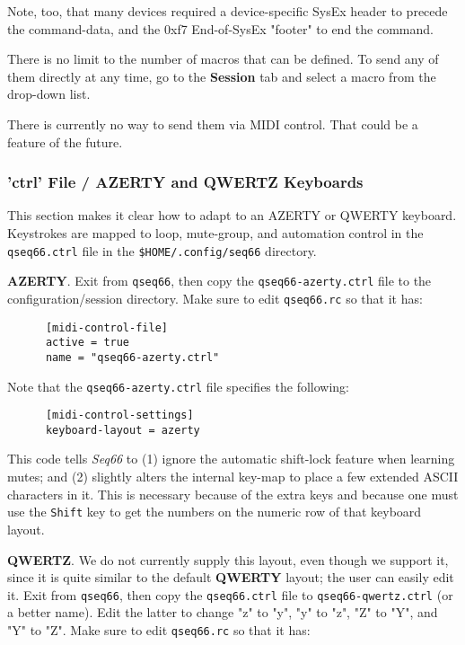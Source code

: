    Note, too, that many devices required a device-specific
   SysEx header to precede the command-data, and the 0xf7
   End-of-SysEx "footer" to end the command.

   There is no limit to the number of macros that can be defined.
   To send any of them directly at any time, go to the
   \textbf{Session} tab and select a macro from the drop-down list.

   There is currently no way to send them via MIDI control.
   That could be a feature of the future.



\subsubsection{'ctrl' File / AZERTY and QWERTZ Keyboards}
\label{subsubsec:configuration_ctrl_azerty}

   This section makes it clear how to adapt to an AZERTY or QWERTY keyboard.
   Keystrokes are mapped to loop, mute-group, and automation control in the
   \texttt{qseq66.ctrl} file in the \texttt{\$HOME/.config/seq66} directory.

   \textbf{AZERTY}.
   Exit from \texttt{qseq66}, then copy the \texttt{qseq66-azerty.ctrl}
   file to the configuration/session directory.
   Make sure to edit \texttt{qseq66.rc} so that it has:

   \begin{verbatim}
      [midi-control-file]
      active = true
      name = "qseq66-azerty.ctrl"
   \end{verbatim}

   Note that the \texttt{qseq66-azerty.ctrl} file specifies the following:

   \begin{verbatim}
      [midi-control-settings]
      keyboard-layout = azerty
   \end{verbatim}

   This code tells \textsl{Seq66} to (1) ignore the automatic shift-lock
   feature when learning mutes; and (2) slightly alters the internal key-map to
   place a few extended ASCII characters in it.  This is necessary because of
   the extra keys and because one must use the
   \texttt{Shift} key to get the numbers on
   the numeric row of that keyboard layout.

   \textbf{QWERTZ}.
   We do not currently supply this layout, even though we support it, since it is
   quite similar to the default \textbf{QWERTY} layout;
   the user can easily edit it.
   Exit from \texttt{qseq66}, then copy the \texttt{qseq66.ctrl}
   file to \texttt{qseq66-qwertz.ctrl} (or a better name).  Edit the latter to
   change "z" to "y", "y" to "z", "Z" to "Y", and "Y" to "Z".
   Make sure to edit \texttt{qseq66.rc} so that it has:

